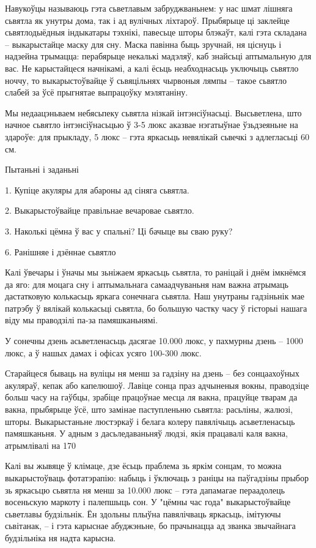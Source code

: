 Навукоўцы называюць гэта сьветлавым забруджваньнем: у нас шмат лішняга сьвятла як унутры дома, так і ад вулічных ліхтароў. Прыбярыце ці заклейце сьвятлодыёдныя індыкатары тэхнікі, павесьце шторы блэкаўт, калі гэта складана – выкарыстайце маску для сну. Маска павінна быць зручнай, ня ціснуць і надзейна трымацца: перабярыце некалькі мадэляў, каб знайсьці аптымальную для вас. Не карыстайцеся начнікамі, а калі ёсьць неабходнасьць уключыць сьвятло ноччу, то выкарыстоўвайце ў сьвяцільнях чырвоныя лямпы – такое сьвятло слабей за ўсё прыгнятае выпрацоўку мэлятаніну.

Мы недаацэньваем небясьпеку сьвятла нізкай інтэнсіўнасьці. Высьветлена, што начное сьвятло інтэнсіўнасьцью ў 3-5 люкс аказвае нэгатыўнае ўзьдзеяньне на здароўе: для прыкладу, 5 люкс – гэта яркасьць невялікай сьвечкі з адлегласьці 60 см.

Пытаньні і заданьні

1. Купіце акуляры для абароны ад сіняга сьвятла.

2. Выкарыстоўвайце правільнае вечаровае сьвятло.

3. Наколькі цёмна ў вас у спальні? Ці бачыце вы сваю руку?


6. Ранішняе і дзённае сьвятло

Калі ўвечары і ўначы мы зьніжаем яркасьць сьвятла, то раніцай і днём імкнёмся да яго: для моцага сну і аптымальнага самаадчуваньня нам важна атрымаць дастатковую колькасьць яркага сонечнага сьвятла. Наш унутраны гадзіньнік мае патрэбу ў вялікай колькасьці сьвятла, бо большую частку часу ў гісторыі нашага віду мы праводзілі па-за памяшканьнямі.

У сонечны дзень асьветленасьць дасягае 10.000 люкс, у пахмурны дзень – 1000 люкс, а ў нашых дамах і офісах усяго 100-300 люкс.

Старайцеся бываць на вуліцы ня менш за гадзіну на дзень – без сонцаахоўных акуляраў, кепак або капелюшоў. Лавіце сонца праз адчыненыя вокны, праводзіце больш часу на гаўбцы, зрабіце працоўнае месца ля вакна, працуйце тварам да вакна, прыбярыце ўсё, што замінае паступленьню сьвятла: расьліны, жалюзі, шторы. Выкарыстаньне люстэркаў і белага колеру павялічыць асьветленасьць памяшканьня. У адным з дасьледаваньняў людзі, якія працавалі каля вакна, атрымлівалі на 170%

Калі вы жывяце ў клімаце, дзе ёсьць праблема зь яркім сонцам, то можна выкарыстоўваць фотатэрапію: набыць і ўключаць з раніцы на паўгадзіны прыбор зь яркасьцю сьвятла ня менш за 10.000 люкс – гэта дапамагае пераадолець восеньскую маркоту і палепшыць сон. У "цёмны час года" выкарыстоўвайце сьветлавы будзільнік. Ён здольны плыўна павялічваць яркасьць, імітуючы сьвітанак, – і гэта карыснае абуджэньне, бо прачынацца ад званка звычайнага будзільніка ня надта карысна.

